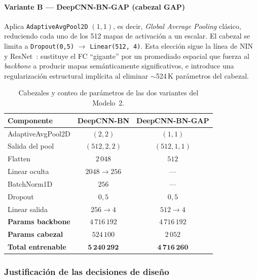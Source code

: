 \paragraph*{Variante B --- DeepCNN-BN-GAP (cabezal GAP)}
Aplica \texttt{AdaptiveAvgPool2D} $(1, 1)$, es decir,
\textit{Global Average Pooling} clásico, reduciendo cada uno
de los 512 mapas de activación a un escalar. El cabezal se
limita a \texttt{Dropout(0{,}5)} $\to$ \texttt{Linear(512, 4)}.
Esta elección sigue la línea de
NIN~\cite{lin2013network} y ResNet~\cite{he2016deep}:
sustituye el FC ``gigante'' por un promediado espacial que
fuerza al \textit{backbone} a producir mapas semánticamente
significativos, e introduce una regularización estructural
implícita al eliminar $\sim$524\,K parámetros del cabezal.

\begin{table}[!t]
\centering
\caption{Cabezales y conteo de parámetros de las dos variantes
del Modelo~2.}
\label{tab:arq-m2-cabezales}
\renewcommand{\arraystretch}{1.15}
\footnotesize
\begin{tabular}{@{}lcc@{}}
\toprule
\textbf{Componente} & \textbf{DeepCNN-BN} & \textbf{DeepCNN-BN-GAP} \\
\midrule
AdaptiveAvgPool2D    & $(2,2)$           & $(1,1)$ \\
Salida del pool      & $(512, 2, 2)$     & $(512, 1, 1)$ \\
Flatten              & $2\,048$          & $512$ \\
Linear oculta        & $2048{\to}256$    & --- \\
BatchNorm1D          & $256$             & --- \\
Dropout              & $0{,}5$           & $0{,}5$ \\
Linear salida        & $256{\to}4$       & $512{\to}4$ \\
\midrule
\textbf{Params backbone}  & $4\,716\,192$ & $4\,716\,192$ \\
\textbf{Params cabezal}   & $524\,100$    & $2\,052$ \\
\textbf{Total entrenable} & $\mathbf{5\,240\,292}$ & $\mathbf{4\,716\,260}$ \\
\bottomrule
\end{tabular}
\end{table}

\subsubsection*{Justificación de las decisiones de diseño}


